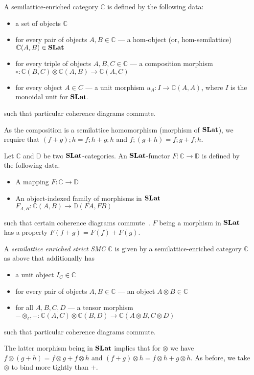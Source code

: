 \begin{definition}
	\label{def:slat-cat}
	A semilattice-enriched category $\mathbb{C}$ is defined by the following data:
	\begin{itemize}
		\item a set of objects $\mathbb{C}$
		\item for every pair of objects $A,B \in \mathbb{C}$ --- a hom-object (or, hom-semilattice) $\mathbb{C}(A,B) \in \mathbf{SLat}$
		\item for every triple of objects $A,B,C \in \mathbb{C}$ --- a composition morphism
		      $\circ: \mathbb{C}(B,C) \otimes \mathbb{C}(A,B) \to \mathbb{C}(A,C)$
		\item for every object $A \in C$ --- a unit morphism
		      $u_{A} : I \to \mathbb{C}(A,A)$, where $I$ is the monoidal unit for $\mathbf{SLat}$.
	\end{itemize}
	such that particular coherence diagrams commute.
\end{definition}
As the composition is a semilattice homomorphism (morphism of $\mathbf{SLat}$), we require that
$
	(f + g); h = f;h + g;h$ and $f;(g+h) = f;g + f;h
$.

\begin{definition}
	Let $\mathbb{C}$ and $\mathbb{D}$ be two $\mathbf{SLat}$-categories.
	An $\mathbf{SLat}$-functor $F : \mathbb{C} \to \mathbb{D}$ is defined by the following data.
	\begin{itemize}
		\item A mapping $F : \mathbb{C} \to \mathbb{D}$
		\item An object-indexed family of morphisms in $\mathbf{SLat}$ $F_{A,B} : \mathbb{C}(A,B) \to \mathbb{D}(FA,FB)$
	\end{itemize}
	such that certain coherence diagrams commute~\cite{Borceux_1994}.
	$F$ being a morphism in $\mathbf{SLat}$ has a property $F(f + g) = F(f) + F(g)$.
\end{definition}

\begin{definition}\label{def:enriched-prop}
	A \textit{semilattice enriched strict SMC}  $\mathbb{C}$ is given by a semilattice-enriched category $\mathbb{C}$ as above that additionally has
	\begin{itemize}
		\item a unit object $I_{C} \in \mathbb{C}$
		\item for every pair of objects $A,B \in \mathbb{C}$ --- an object $A \otimes B \in \mathbb{C}$
		\item for all $A,B,C,D$ --- a tensor morphism $ - \otimes_{C} - : \mathbb{C}(A,C) \otimes \mathbb{C}(B,D) \to \mathbb{C}(A \otimes B, C \otimes D)$
	\end{itemize}
	such that particular coherence diagrams commute.
\end{definition}
The latter morphism being in $\mathbf{SLat}$ implies that for $\otimes$ we have
$
	f \otimes (g+h) = f \otimes g + f \otimes h $ and $ (f+g) \otimes h = f \otimes h + g \otimes h
$.
As before, we take $\otimes$ to bind more tightly than $+$.

